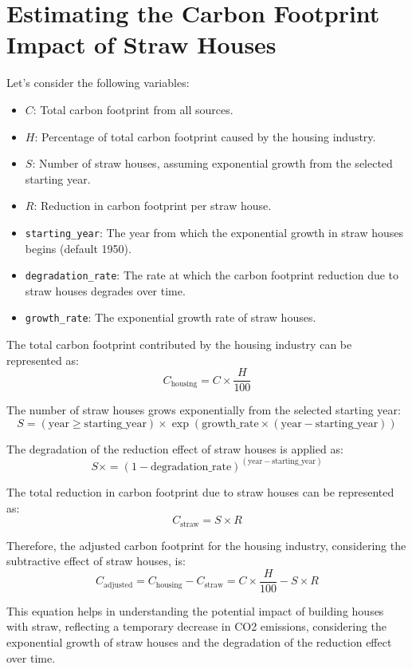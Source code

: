 \documentclass{article}
\begin{document}
\section{Estimating the Carbon Footprint Impact of Straw Houses}

Let's consider the following variables:
\begin{itemize}
	\item $C$: Total carbon footprint from all sources.
	\item $H$: Percentage of total carbon footprint caused by the housing industry.
	\item $S$: Number of straw houses, assuming exponential growth from the selected starting year.
	\item $R$: Reduction in carbon footprint per straw house.
	\item \texttt{starting\_year}: The year from which the exponential growth in straw houses begins (default 1950).
	\item \texttt{degradation\_rate}: The rate at which the carbon footprint reduction due to straw houses degrades over time.
	\item \texttt{growth\_rate}: The exponential growth rate of straw houses.
\end{itemize}

The total carbon footprint contributed by the housing industry can be represented as:
\[
C_{\text{housing}} = C \times \frac{H}{100}
\]

The number of straw houses grows exponentially from the selected starting year:
\[
S = (\text{year} \geq \text{starting\_year}) \times \exp(\text{growth\_rate} \times (\text{year} - \text{starting\_year}))
\]

The degradation of the reduction effect of straw houses is applied as:
\[
S \times= (1 - \text{degradation\_rate})^{(\text{year} - \text{starting\_year})}
\]

The total reduction in carbon footprint due to straw houses can be represented as:
\[
C_{\text{straw}} = S \times R
\]

Therefore, the adjusted carbon footprint for the housing industry, considering the subtractive effect of straw houses, is:
\[
C_{\text{adjusted}} = C_{\text{housing}} - C_{\text{straw}} = C \times \frac{H}{100} - S \times R
\]

This equation helps in understanding the potential impact of building houses with straw, reflecting a temporary decrease in CO2 emissions, considering the exponential growth of straw houses and the degradation of the reduction effect over time.
\end{document}
